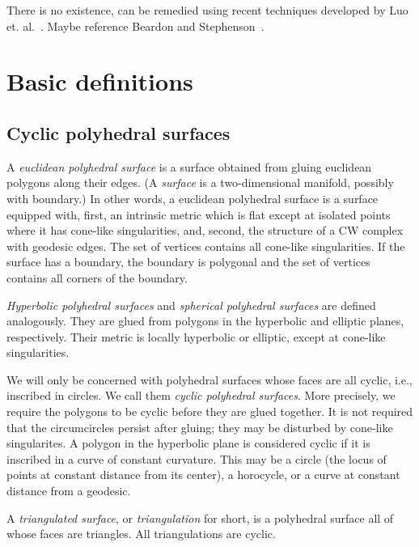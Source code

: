 \documentclass[Thesis]{subfiles}
\begin{document}
There is no existence, can be remedied using recent techniques developed by Luo et. al.~\cite{Luo13, Luo14}.
Maybe reference Beardon and Stephenson~\cite{BS90}.


\section{Basic definitions}

\subsection{Cyclic polyhedral surfaces }

A \emph{euclidean polyhedral surface} is a surface obtained from
gluing euclidean polygons along their edges. (A \emph{surface} is a
two-dimensional manifold, possibly with boundary.)  In other words, a
euclidean polyhedral surface is a surface equipped with, first, an
intrinsic metric which is flat except at isolated points where it has
cone-like singularities, and, second, the structure of a CW complex
with geodesic edges. The set of vertices contains all cone-like
singularities. If the surface has a boundary, the boundary is
polygonal and the set of vertices contains all corners of the
boundary.

\emph{Hyperbolic polyhedral surfaces} and \emph{spherical polyhedral
surfaces} are defined analogously. They are glued from polygons in
the hyperbolic and elliptic planes, respectively. Their metric is
locally hyperbolic or elliptic, except at cone-like singularities.

We will only be concerned with polyhedral surfaces whose faces are all
cyclic, i.e., inscribed in circles. We call them \emph{cyclic
polyhedral surfaces}. More precisely, we require the polygons to be
cyclic before they are glued together. It is not required that the
circumcircles persist after gluing; they may be disturbed by cone-like
singularites. A polygon in the hyperbolic plane is considered cyclic
if it is inscribed in a curve of constant curvature. This may be a
circle (the locus of points at constant distance from its center), a
horocycle, or a curve at constant distance from a geodesic.

A \emph{triangulated surface}, or \emph{triangulation} for short, is a
polyhedral surface all of whose faces are triangles.  All
triangulations are cyclic.
\end{document}
